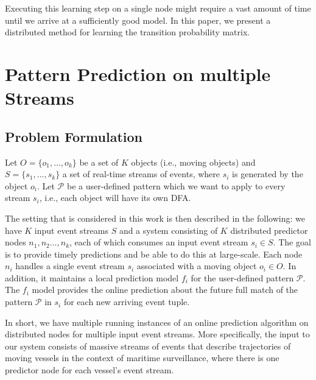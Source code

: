 Executing this learning step on a single node might require a vast amount of time until we arrive at a sufficiently good model.
In this paper, we present a distributed method for learning the transition probability matrix.

\section{Pattern Prediction on multiple Streams}

\subsection{Problem Formulation}
Let $O = \{ o_1, ..., o_k\}$ be a set of \emph{$K$}  objects (i.e., moving objects) 
and $S = \{ s_1, ..., s_k\}$ a set of real-time streams of events,
where $s_i$ is generated by the object $o_i$.
Let $\mathcal{P}$ be a user-defined pattern which we want to apply to every stream $s_i$,
i.e., each object will have its own DFA.

\par The setting that is considered in this work is then described in the following:
we have \emph{$K$} input event streams $S$ and a system consisting of \emph{$K$} distributed predictor nodes $n_1,n_2...,n_k$, each of which consumes an input event stream $s_i\in S$. The goal is to provide timely predictions and be able to do this at large-scale.
Each node $n_i$ handles a single event stream $s_i$ associated with a moving object $o_i \in O$. In addition,  it  maintains a local prediction model $f_i$ for the user-defined pattern $\mathcal{P}$. The $f_i$ model provides the online prediction about the future full match of the pattern $\mathcal{P}$ in $s_i$  for each new arriving event tuple. 
\par In short, we have multiple running instances of an online prediction algorithm on distributed nodes for multiple input event streams. More specifically, the input to our system consists of massive streams of events  that describe trajectories of moving vessels in the context of maritime surveillance, where there is one predictor node for each vessel's event stream.
  
%

